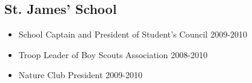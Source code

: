 \documentclass[11pt,a4paper]{moderncv}
\begin{document}
\subsection{St. James’ School}
\begin{itemize}
\item School Captain and President of Student’s Council \hfill 2009-2010
\item Troop Leader of Boy Scouts Association \hfill 2008-2010
\item Nature Club President \hfill 2009-2010
\begin{comment}
\item President of inter-school cultural fest Jaco Sanskriti\hfill 2009
\item Vice President of inter-school quiz competition Jaco-Iz\hfill 2009
\end{comment}
\end{itemize}
\begin{comment}
\subsection{Editor}
\item Jacobean \hfill 2009-10
\item Yearbook \hfill 2008-09
\item The School Scroll \hfill 2008-09
\subsection{Boy Scouts Movement}
\begin{itemize}
        \item Troop Leader of Scouting of the St. James' Boy Scouts Group
        \item Organized 3 winter camps with roughly 150 scouts and cubs from ages X-X
        \item Organized several hikes and outdoor excursions
        \item Extensive knowledge of the Scout Movement and Scout Techniques
\end{itemize}
\end{comment}
\end{document}
